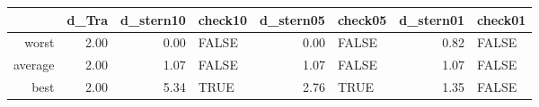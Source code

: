 \begin{tabular}{rrrlrlrl}
  \toprule
 & d\_Tra & d\_stern10 & check10 & d\_stern05 & check05 & d\_stern01 & check01 \\ 
  \midrule
worst & 2.00 & 0.00 & FALSE & 0.00 & FALSE & 0.82 & FALSE \\ 
  average & 2.00 & 1.07 & FALSE & 1.07 & FALSE & 1.07 & FALSE \\ 
  best & 2.00 & 5.34 & TRUE & 2.76 & TRUE & 1.35 & FALSE \\ 
   \bottomrule
\end{tabular}
